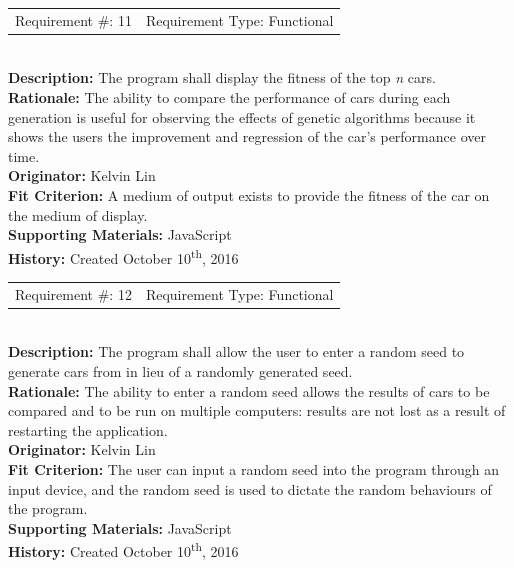 \documentclass[12pt, titlepage]{article}
\begin{document}
\begin{reqbox}
%
\begin{tabular}{cc}
Requirement \#: 11 & Requirement Type: Functional \\
\end{tabular} \\
%
\textbf{Description:} The program shall display the fitness of the top 
\textit{n} cars. \\
\textbf{Rationale:} The ability to compare the performance of cars during each 
generation is useful for observing the effects of genetic algorithms because it 
shows the users the improvement and regression of the car's performance over 
time.\\
\textbf{Originator:} Kelvin Lin\\
\textbf{Fit Criterion:} A medium of output exists to provide the fitness of the 
car on the medium of display.\\
%  
\textbf{Supporting Materials:} JavaScript \\
\textbf{History:} Created October 10\textsuperscript{th}, 2016
%
\end{reqbox}

\begin{reqbox}
%
\begin{tabular}{cc}
Requirement \#: 12 & Requirement Type: Functional \\
\end{tabular} \\
%
\textbf{Description:} The program shall allow the user to enter a random seed to 
generate cars from in lieu of a randomly generated seed. \\
\textbf{Rationale:} The ability to enter a random seed allows the results of 
cars to be compared and to be run on multiple computers: results are not lost as 
a result of restarting the application. \\
\textbf{Originator:} Kelvin Lin\\
\textbf{Fit Criterion:} The user can input a random seed into the program 
through an input device, and the random seed is used to dictate the random 
behaviours of the program.\\
%  
\textbf{Supporting Materials:} JavaScript \\
\textbf{History:} Created October 10\textsuperscript{th}, 2016
%
\end{reqbox}

\newpage
\end{document}
